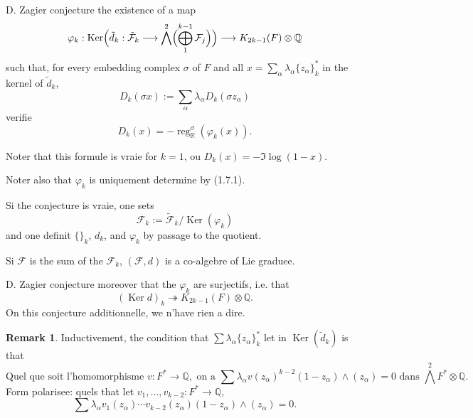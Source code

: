 \documentclass[12pt,a4paper]{article}
\theoremstyle{plain}
\theoremstyle{definition}
\newtheorem{remark}{Remark}[section]
\theoremstyle{remark}
\DeclareMathOperator*{\Ker}{Ker}
\DeclareMathOperator{\reg}{reg}
\newcommand{\Q}{\mathbb{Q}}
\newcommand{\R}{\mathbb{R}}
\newcommand{\F}{\mathcal{F}}
\begin{document}
{D. Zagier conjecture the existence of a map
\begin{equation*}
\varphi_k : \Ker\Bigl(\tilde{d}_k:\tilde{\F}_k\longrightarrow\bigwedge^2\Bigl(\bigoplus_1^{k-1}\F_j\Bigr)\Bigr) \longrightarrow K_{2k-1}(F)\otimes\Q
\end{equation*}
such that, for every embedding complex $\sigma$ of $F$ and all $x=\sum_\alpha\lambda_\alpha\{z_\alpha\}_k^*$ in the kernel of $\tilde{d}_k$,
\begin{equation*}
D_k(\sigma x) := \sum_\alpha\lambda_\alpha D_k(\sigma z_\alpha)
\end{equation*}
v{e}rifie
\begin{equation}\label{eq:1.7.1}
D_k(x) = -\reg_\R^\sigma(\varphi_k(x)).
\tag{1.7.1}
\end{equation}

Noter that this formule is vraie for $k=1$, o{u} $D_k(x)=-\Im\log(1-x)$.

Noter also that $\varphi_k$ is uniquement d{e}termin{e} by (1.7.1).

Si the conjecture is vraie, one sets
\begin{equation*}
\F_k := \tilde{\F}_k/\Ker(\varphi_k)
\end{equation*}
and one d{e}finit $\{\}_k$, $d_k$, and $\varphi_k$ by passage to the quotient.

Si $\F$ is the sum of the $\F_k$, $(\F,d)$ is a co-alg{e}bre of Lie gradu{e}e.

D. Zagier conjecture moreover that the $\varphi_k$ are surjectifs, i.e. that
\begin{equation*}
(\Ker d)_k \twoheadrightarrow K_{2k-1}(F)\otimes\Q.
\end{equation*}
On this conjecture additionnelle, we n'have rien {a} dire.

\begin{remark}
Inductivement, the condition that $\sum\lambda_\alpha\{z_\alpha\}_k^*$ let in $\Ker(\tilde{d}_k)$ is that
\begin{equation}\label{eq:1.8.1}
\text{Quel que soit l'homomorphisme }v:F^*\to\Q,\text{ on a }\sum\lambda_\alpha v(z_\alpha)^{k-2}(1-z_\alpha)\wedge(z_\alpha)=0\text{ dans }\bigwedge^2 F^*\otimes\Q.\tag{1.8.1}
\end{equation}
Form polaris{e}e: quels that let $v_1,\ldots,v_{k-2}:F^*\to\Q$,
\begin{equation*}
\sum\lambda_\alpha v_1(z_\alpha)\cdots v_{k-2}(z_\alpha)(1-z_\alpha)\wedge(z_\alpha)=0.
\end{equation*}


\end{remark}}
\end{document}

